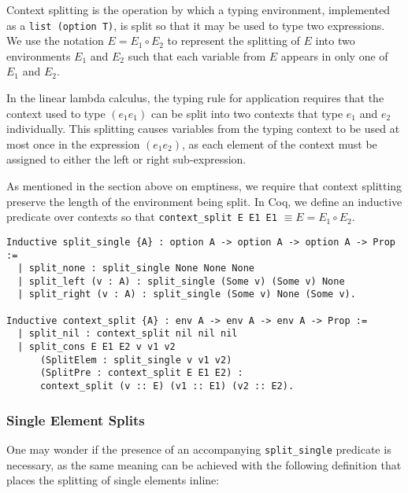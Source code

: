 \documentclass[]{unswthesis}
\let\c\texttt
\begin{document}


Context splitting is the operation by which a typing environment, implemented as a \c{list (option T)}, is split so that it may be used to type two expressions. We use the notation $E = E_1 \circ E_2$ to represent the splitting of $E$ into two environments $E_1$ and $E_2$ such that each variable from $E$ appears in only one of $E_1$ and $E_2$.

In the linear lambda calculus, the typing rule for application requires that the context used to type $(e_1 e_1)$ can be split into two contexts that type $e_1$ and $e_2$ individually. This splitting causes variables from the typing context to be used at most once in the expression $(e_1 e_2)$, as each element of the context must be assigned to either the left or right sub-expression.

As mentioned in the section above on emptiness, we require that context splitting preserve the length of the environment being split. In Coq, we define an inductive predicate over contexts so that \c{context_split E E1 E1} $\equiv E = E_1 \circ E_2$.

\begin{verbatim}
Inductive split_single {A} : option A -> option A -> option A -> Prop :=
  | split_none : split_single None None None
  | split_left (v : A) : split_single (Some v) (Some v) None
  | split_right (v : A) : split_single (Some v) None (Some v).

Inductive context_split {A} : env A -> env A -> env A -> Prop :=
  | split_nil : context_split nil nil nil
  | split_cons E E1 E2 v v1 v2
      (SplitElem : split_single v v1 v2)
      (SplitPre : context_split E E1 E2) :
      context_split (v :: E) (v1 :: E1) (v2 :: E2).
\end{verbatim}

\subsubsection{Single Element Splits}

One may wonder if the presence of an accompanying \c{split_single} predicate is necessary, as the same meaning can be achieved with the following definition that places the splitting of single elements inline:
\end{document}
